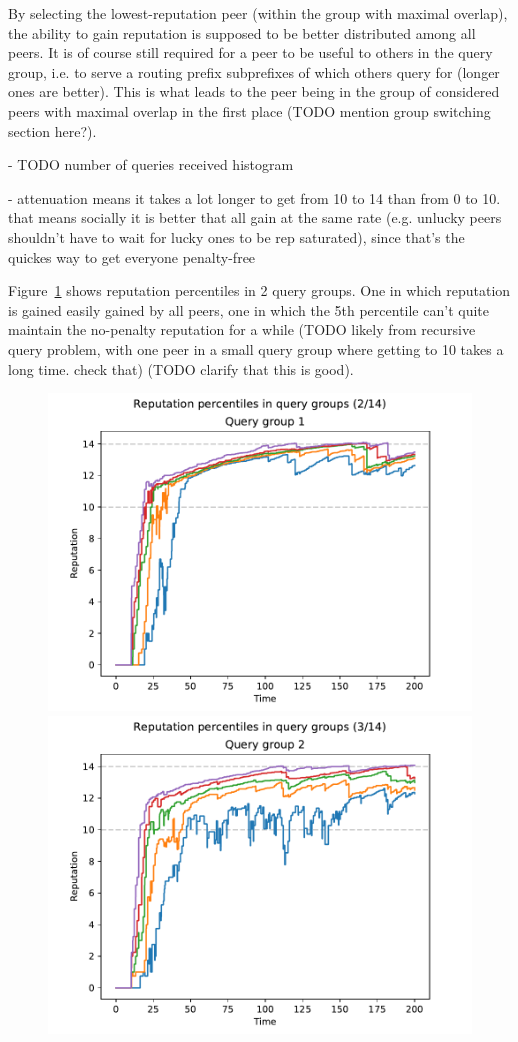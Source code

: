 By selecting the lowest-reputation peer (within the group with maximal overlap),
the ability to gain reputation is supposed to be better distributed among all
peers. It is of course still required for a peer to be useful to others in the
query group, i.e. to serve a routing prefix subprefixes of which others query
for (longer ones are better). This is what leads to the peer being in the group
of considered peers with maximal overlap in the first place (TODO mention group
switching section here?).

- TODO number of queries received histogram

- attenuation means it takes a lot longer to get from 10 to 14 than from 0 to
  10. that means socially it is better that all gain at the same rate (e.g.
  unlucky peers shouldn't have to wait for lucky ones to be rep saturated),
  since that's the quickes way to get everyone penalty-free

Figure~\ref{fig:selection_overlap_rep_sorted_rep_percs} shows reputation
percentiles in 2 query groups. One in which reputation is gained easily gained
by all peers, one in which the 5th percentile can't quite maintain the
no-penalty reputation for a while (TODO likely from recursive query problem,
with one peer in a small query group where getting to 10 takes a long time.
check that) (TODO clarify that this is good).

\begin{figure}[t]
\centering
\includegraphics[width=0.5\columnwidth]{figures/selection_overlap_rep_sorted_rep_percs_2_of_14}%
\includegraphics[width=0.5\columnwidth]{figures/selection_overlap_rep_sorted_rep_percs_3_of_14}
\label{fig:selection_overlap_rep_sorted_rep_percs}
\end{figure}

